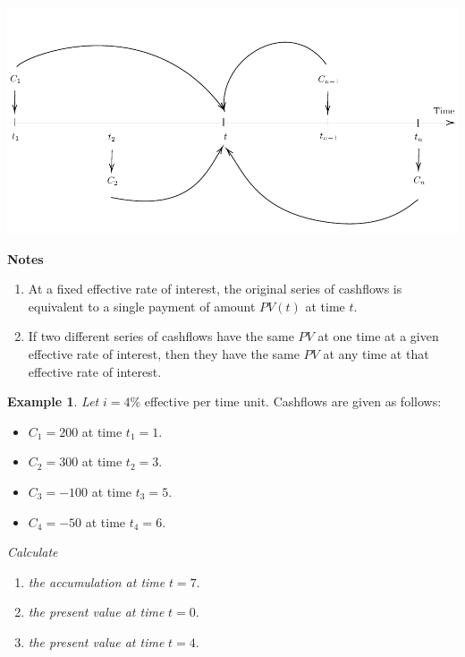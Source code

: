 \documentclass[
]{book}
\theoremstyle{definition}
\theoremstyle{definition}
\newtheorem{example}{Example}[chapter]
\theoremstyle{definition}
\theoremstyle{definition}
\theoremstyle{remark}
\begin{document}
\begin{center}\includegraphics{SCMA266Bookdownproj_files/figure-latex/tikz-ex7-1} \end{center}

\textbf{Notes}

\begin{enumerate}
\def\labelenumi{\arabic{enumi}.}
\item
  At a fixed effective rate of interest, the original series of
  cashflows is equivalent to a single payment of amount \(PV(t)\) at
  time \(t\).
\item
  If two different series of cashflows have the same \(PV\) at one time
  at a given effective rate of interest, then they have the same \(PV\)
  at any time at that effective rate of interest.
\end{enumerate}

\begin{example}

\emph{Let} \(i = 4\%\) effective per time unit. Cashflows are given as follows:

\begin{itemize}
\item
  \(C_1 = 200\) at time \(t_1 = 1\).
\item
  \(C_2 = 300\) at time \(t_2 = 3\).
\item
  \(C_3 = -100\) at time \(t_3 = 5\).
\item
  \(C_4 = -50\) at time \(t_4 = 6\).
\end{itemize}

\emph{Calculate}

\begin{enumerate}
\def\labelenumi{\arabic{enumi}.}
\item
  \emph{the accumulation at time} \(t = 7\).
\item
  \emph{the present value at time} \(t = 0\).
\item
  \emph{the present value at time} \(t = 4\).
\end{enumerate}

\end{example}
\end{document}
